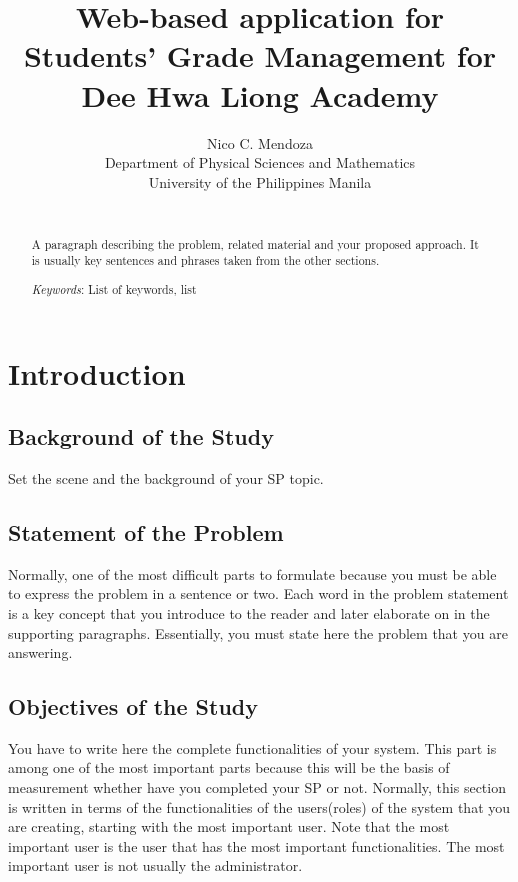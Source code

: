 \documentclass[11pt,a4paper,titlepage]{article}
\title {Web-based application for Students' Grade Management for Dee Hwa Liong Academy}
\author {Nico C. Mendoza \\ Department of Physical Sciences and Mathematics \\ University of the Philippines Manila \\ \\
}
\date{}
\let\stdsection\section
\renewcommand\section{\newpage\stdsection}
\newcommand{\Keywords}[1]{\par\noindent 
{\small{\em Keywords\/}: #1}}
\begin{document}
\maketitle
\doublespacing

\begin{abstract}
\thispagestyle{plain}
\setcounter{page}{2}
A paragraph describing the problem, related material and your proposed approach. It is usually key sentences and phrases taken from the other sections.

\Keywords{List of keywords, list}
\end{abstract}

\setcounter{page}{3}
\setcounter{tocdepth}{3}
\tableofcontents
\newpage

\section{Introduction}
\setcounter{page}{1}
\subsection{Background of the Study}
Set the scene and the background of your SP topic. 

\subsection{Statement of the Problem}
Normally, one of the most difficult parts to formulate because you must be able to express the problem in a sentence or two. Each word in the problem statement is a key concept that you introduce to the reader and later elaborate on in the supporting paragraphs. 
Essentially, you must state here the problem that you are answering.

\subsection{Objectives of the Study}
You have to write here the complete functionalities of your system. This part is among one of the most important parts because this will
be the basis of measurement whether have you completed your SP or not. Normally, this section is written in terms of the functionalities
of the users(roles) of the system that you are creating, starting with the most important user. Note that the most important user is the user
that has the most important functionalities. The most important user is not usually the administrator.
\end{document}
